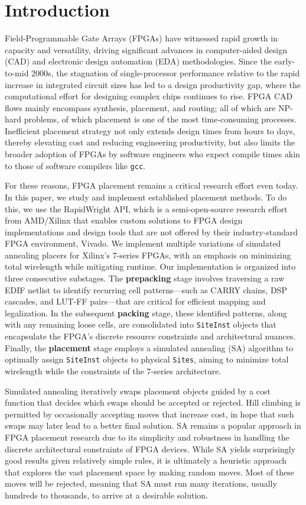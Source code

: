 \section{Introduction}

Field-Programmable Gate Arrays (FPGAs) have witnessed rapid growth in capacity and versatility, driving significant advances in computer-aided design (CAD) and electronic design automation (EDA) methodologies. 
Since the early-to-mid 2000s, the stagnation of single-processor performance relative to the rapid increase in integrated circuit sizes has led to a design productivity gap, where the computational effort for designing complex chips continues to rise. 
FPGA CAD flows mainly encompass synthesis, placement, and routing; all of which are NP-hard problems, of which placement is one of the most time-consuming processes. 
Inefficient placement strategy not only extends design times from hours to days, thereby elevating cost and reducing engineering productivity, but also limits the broader adoption of FPGAs by software engineers who expect compile times akin to those of software compilers like {\tt gcc}. 

For these reasons, FPGA placement remains a critical research effort even today. 
In this paper, we study and implement established placement methods. 
To do this, we use the RapidWright API, which is a semi-open-source research effort from AMD/Xilinx that enables custom solutions to FPGA design implementations and design tools that are not offered by their industry-standard FPGA environment, Vivado. 
We implement multiple variations of simulated annealing placers for Xilinx's 7-series FPGAs, with an emphasis on minimizing total wirelength while mitigating runtime. 
Our implementation is organized into three consecutive substages. 
The \textbf{prepacking} stage involves traversing a raw EDIF netlist to identify recurring cell patterns—such as CARRY chains, DSP cascades, and LUT-FF pairs—that are critical for efficient mapping and legalization. 
In the subsequent \textbf{packing} stage, these identified patterns, along with any remaining loose cells, are consolidated into \texttt{SiteInst} objects that encapsulate the FPGA’s discrete resource constraints and architectural nuances. 
Finally, the \textbf{placement} stage employs a simulated annealing (SA) algorithm to optimally assign \texttt{SiteInst} objects to physical \texttt{Sites}, aiming to minimize total wirelength while the constraints of the 7-series architecture. 

Simulated annealing iteratively swaps placement objects guided by a cost function that decides which swaps should be accepted or rejected. 
Hill climbing is permitted by occasionally accepting moves that increase cost, in hope that such swaps may later lead to a better final solution. 
SA remains a popular approach in FPGA placement research due to its simplicity and robustness in handling the discrete architectural constraints of FPGA devices. 
While SA yields surprisingly good results given relatively simple rules, it is ultimately a heuristic approach that explores the vast placement space by making random moves. 
Most of these moves will be rejected, meaning that SA must run many iterations, usually hundreds to thousands, to arrive at a desirable solution. 

